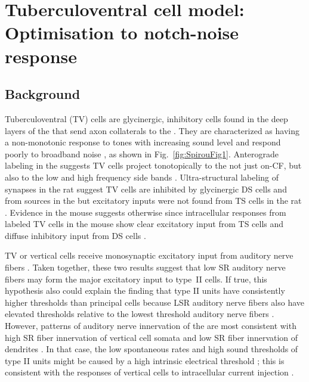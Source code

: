 
\section[TV Cell Model]{Tuberculoventral cell model: Optimisation to notch-noise response}
\label{sec:TV-cell-model}

\subsection{Background}

Tuberculoventral (TV) cells are glycinergic, inhibitory cells found in the
deep layers of the \DCN that send axon collaterals to the \VCN\@. They are
characterized as having a non-monotonic response to tones with increasing
sound level and respond poorly to broadband noise
\citep{SpirouDavisEtAl:1999,NelkenYoung:1997,ReissYoung:2005}, as shown in
Fig.~\ref{fig:SpirouFig1}.  Anterograde labeling in the \DCN suggests TV
cells project tonotopically to the \VCN not just on-CF, but also to the low
and high frequency side bands
\citep{MunirathinamOstapoffEtAl:2004,OstapoffMorestEtAl:1999}.
Ultra-structural labeling of synapses in the rat \DCN suggest TV cells are
inhibited by glycinergic DS cells and from sources in the \DCN but
excitatory inputs were not found from TS cells in the rat
\citep{Rubio:2005}. Evidence in the mouse suggests otherwise since
intracellular responses from labeled TV cells in the mouse show clear
excitatory input from TS cells and diffuse inhibitory input from DS cells
\citep{ZhangOertel:1993b,WickesbergOertel:1993}.

\smallskip{} 

TV or vertical cells receive monosynaptic excitatory input from auditory
nerve ﬁbers \citep{OertelWu:1989,ZhangOertel:1993b}. Taken together, these
two results suggest that low SR auditory nerve ﬁbers may form the major
excitatory input to type~II cells. If true, this hypothesis also could
explain the ﬁnding that type II units have consistently higher thresholds
than \DCN principal cells \citep{YoungBrownell:1976} because LSR
auditory nerve ﬁbers also have elevated thresholds relative to the lowest
threshold auditory nerve ﬁbers \citep{Liberman:1978}. However, patterns of
auditory nerve innervation of the \DCN are most consistent with high SR
ﬁber innervation of vertical cell somata and low SR ﬁber innervation of
dendrites \citep{Liberman:1993}. In that case, the low spontaneous rates
and high sound thresholds of type II units might be caused by a high
intrinsic electrical threshold \citep{HancockDavisEtAl:1997}; this is
consistent with the responses of vertical cells to intracellular current
injection \citep{DingVoigt:1997,ZhangOertel:1993b}.

